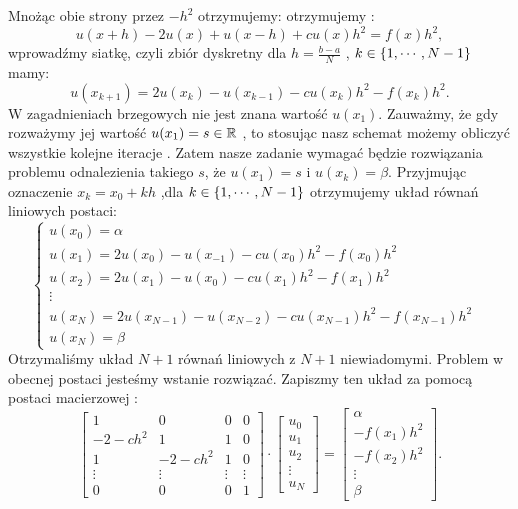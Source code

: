 \documentclass[12pt,a4paper]{report}
\begin{document}
Mnożąc obie strony przez $-h^2$ otrzymujemy:  otrzymujemy :
\begin{equation}
u(x+h) - 2u(x) + u(x-h) + cu(x)h^2 = f(x)h^2,
\end{equation}
wprowadźmy siatkę, czyli zbiór dyskretny dla $ h= \frac{b-a}{N}$ , $k \in \left\lbrace {1,\cdots,N-1} \right\rbrace$  mamy: 
\begin{equation} \label{boundary_model}
u(x_{k+1}) = 2u(x_k) - u(x_{k-1}) - cu(x_k)h^2 - f(x_k)h^2.
\end{equation}
W zagadnieniach brzegowych nie jest znana wartość $u(x_1)$. Zauważmy, że gdy rozważymy jej wartość $u(x_1) = s \in \mathbb{R}$ , to stosując nasz schemat możemy obliczyć wszystkie kolejne iteracje . Zatem nasze zadanie wymagać będzie rozwiązania problemu odnalezienia takiego $s$, że $u(x_1) = s$ i $u(x_k) = \beta$. Przyjmując oznaczenie $ x_k = x_0 + kh$ ,dla $ k \in \left\lbrace {1, \cdots,N-1} \right\rbrace $ otrzymujemy układ równań liniowych postaci:
\begin{equation}
\left\{ \begin{array}{ll}
u(x_0) = \alpha & \\
u(x_1) = 2u(x_0) - u(x_{-1}) - cu(x_0)h^2 - f(x_0)h^2 & \\
u(x_2) = 2u(x_1) - u(x_{0}) - cu(x_1)h^2 - f(x_1)h^2 & \\ 
\vdots  & \\
u(x_{N}) = 2u(x_{N-1}) - u(x_{N-2}) - cu(x_{N-1})h^2 - f(x_{N-1})h^2  & \\
u(x_N) = \beta &
\end{array} \right.
\end{equation}
Otrzymaliśmy układ $N+1$ równań liniowych z $N+1$ niewiadomymi. Problem w obecnej postaci jesteśmy wstanie rozwiązać. Zapiszmy ten układ za pomocą postaci macierzowej :
$$ 
\left[ \begin{array}{cccc}
1 & 0 & 0 & 0 \\
-2-ch^2 & 1 & 1 & 0 \\
1 & -2-ch^2 & 1 & 0 \\
\vdots & \vdots & \vdots & \vdots \\
0 & 0 & 0 & 1 
\end{array} \right] \cdot
\left[ \begin{array}{c}
u_0 \\
u_1 \\
u_2 \\
\vdots \\
u_{N}  
\end{array} \right] =
\left[ \begin{array}{c}
\alpha \\
-f(x_1)h^2 \\
-f(x_2)h^2\\
\vdots \\
\beta   
\end{array} \right] .
$$
\end{document}
